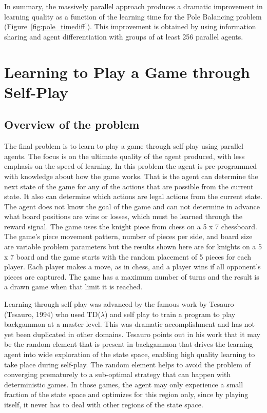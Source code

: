 \documentclass[11pt]{article} %
\begin{document}
\begin{flushleft}

In summary, the massively parallel approach produces a dramatic improvement in learning quality as a function of the learning time for the Pole Balancing problem (Figure~\ref{fig:pole_timediff}).  This improvement is obtained by using information sharing and agent differentiation with groups of at least 256 parallel agents. 


\section{Learning to Play a Game through Self-Play}
\subsection{Overview of the problem}
The final problem is to learn to play a game through self-play using parallel agents.  The focus is on the ultimate quality of the agent produced, with less emphasis on the speed of learning.  In this problem the agent is pre-programmed with knowledge about how the game works.  That is the agent can determine the next state of the game for any of the actions that are possible from the current state.  It also can determine which actions are legal actions from the current state.  The agent does not know the goal of the game and can not determine in advance what board positions are wins or losses, which must be learned through the reward signal.  The game uses the knight piece from chess on a 5 x 7 chessboard.  The game’s piece movement pattern, number of pieces per side, and board size are variable problem parameters but the results shown here are for knights on a 5 x 7 board and the game starts with the random placement of 5 pieces for each player.  Each player makes a move, as in chess, and a player wins if all opponent’s pieces are captured.  The game has a maximum number of turns and the result is a drawn game when that limit it is reached.

Learning through self-play was advanced by the famous work by Tesauro (Tesauro, 1994) who used TD($\lambda$) and self play to train a program to play backgammon at a master level.  This was dramatic accomplishment and has not yet been duplicated in other domains.  Tesauro points out in his work that it may be the random element that is present in backgammon that drives the learning agent into wide exploration of the state space, enabling high quality learning to take place during self-play.  The random element helps to avoid the problem of converging prematurely to a sub-optimal strategy that can happen with deterministic games.  In those games, the agent may only experience a small fraction of the state space and optimizes for this region only, since by playing itself, it never has to deal with other regions of the state space.


\end{flushleft}
\end{document}
